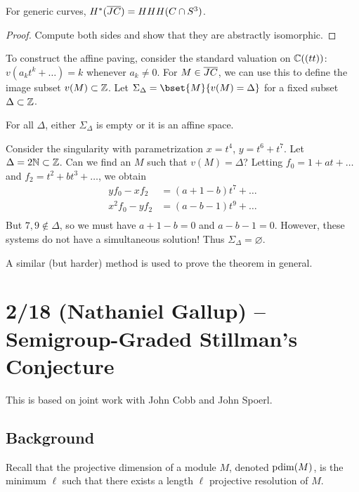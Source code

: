 \documentclass{article}
\begin{document}
\begin{thm}
	For generic curves, $H^*(\overline{JC}) = HHH(C \cap S^3)$.
\end{thm}

\begin{proof}
	Compute both sides and show that they are abstractly isomorphic.
\end{proof}

To construct the affine paving, consider the standard valuation on $\mathbb{C}((tt))$: $v(a_k t^k + \dots) = k$ whenever $a_k \neq 0$.
For $M \in \overline{JC}$, we can use this to define the image subset $v(M) \subset \mathbb{Z}$.
Let $\Sigma_\Delta = \bset{M}{v(M) = \Delta}$ for a fixed subset $\Delta \subset \mathbb{Z}$.

\begin{thm}
	For all $\Delta$, either $\Sigma_\Delta$ is empty or it is an affine space.
\end{thm}

\begin{ex}
	Consider the singularity with parametrization $x = t^4$, $y = t^6 + t^7$.
	Let $\Delta = 2 \mathbb{N} \subset \mathbb{Z}$.
	Can we find an $M$ such that $v(M) = \Delta$?
	Letting $f_0 = 1 + a t + \dots$ and $f_2 = t^2 + b t^3 + \dots$, we obtain
	\begin{align*}
		y f_0 - x f_2 &= (a + 1 - b) t^7 + \dots \\
		x^2 f_0 - y f_2 &= (a - b - 1) t^9 + \dots \\
	\end{align*}
	But $7, 9 \not\in \Delta$, so we must have $a + 1 - b = 0$ and $a - b - 1 = 0$.
	However, these systems do not have a simultaneous solution!
	Thus $\Sigma_\Delta = \varnothing$.
\end{ex}

A similar (but harder) method is used to prove the theorem in general.

\section{2/18 (Nathaniel Gallup) -- Semigroup-Graded Stillman's Conjecture}

This is based on joint work with John Cobb and John  Spoerl.

\subsection{Background}

Recall that the projective dimension of a module $M$, denoted $\operatorname{pdim}(M)$, is the minimum $\ell$ such that there exists a length $\ell$ projective resolution of $M$.
\end{document}

